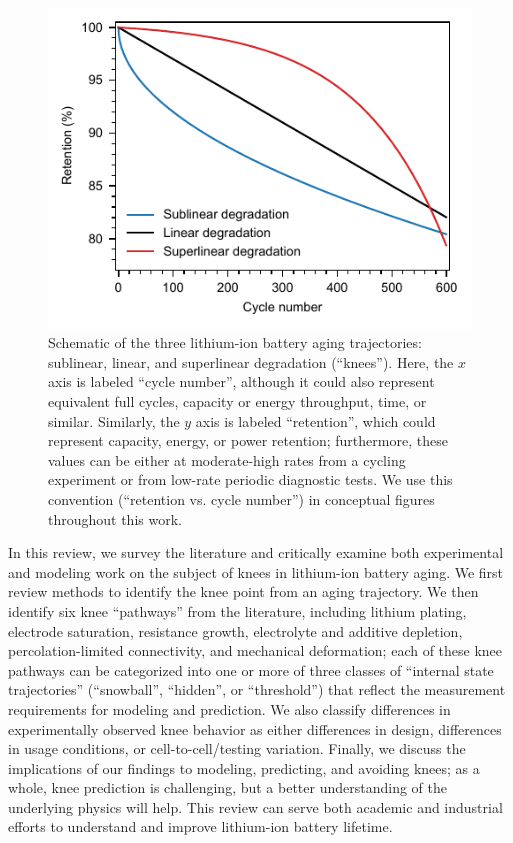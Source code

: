 \documentclass[journal=jpclcd,manuscript=article]{achemso}
\begin{document}
\begin{figure}[t]
\centering
\includegraphics[scale=1]{final_figures/degradation_rates.pdf}
\caption{Schematic of the three lithium-ion battery aging trajectories: sublinear, linear, and superlinear degradation (``knees''). Here, the $x$ axis is labeled ``cycle number'', although it could also represent equivalent full cycles, capacity or energy throughput, time, or similar. Similarly, the $y$ axis is labeled ``retention'', which could represent capacity, energy, or power retention; furthermore, these values can be either at moderate-high rates from a cycling experiment or from low-rate periodic diagnostic tests. We use this convention (``retention vs. cycle number'') in conceptual figures throughout this work.}
\label{fig:degradation_shapes}
\end{figure}

In this review, we survey the literature and critically examine both experimental and modeling work on the subject of knees in lithium-ion battery aging. We first review methods to identify the knee point from an aging trajectory. We then identify six knee ``pathways'' from the literature, including lithium plating, electrode saturation, resistance growth, electrolyte and additive depletion, percolation-limited connectivity, and mechanical deformation; each of these knee pathways can be categorized into one or more of three classes of ``internal state trajectories'' (``snowball'', ``hidden'', or ``threshold'') that reflect the measurement requirements for modeling and prediction. We also classify differences in experimentally observed knee behavior as either differences in design, differences in usage conditions, or cell-to-cell/testing variation. Finally, we discuss the implications of our findings to modeling, predicting, and avoiding knees; as a whole, knee prediction is challenging, but a better understanding of the underlying physics will help. This review can serve both academic and industrial efforts to understand and improve lithium-ion battery lifetime.
\end{document}
